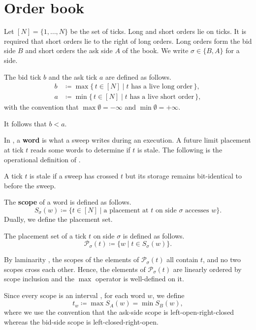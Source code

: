 \section{Order book} \label{sec:book}
Let $[N]=\{1,\dots,N\}$ be the set of ticks. Long and short orders lie on ticks. It is required that short orders lie to the right of long orders. Long orders form the bid side $B$ and short orders the ask side $A$ of the book. We write $\sigma\in\{B,A\}$ for a side.
\begin{definition} \label{def:bidask}
    The bid tick $b$ and the ask tick $a$ are defined as follows.
    \begin{align*}
        b&\coloneqq\max\{\,t\in[N]\mid t \text{ has a live long order}\,\},\\
        a&\coloneqq\min\{\,t\in[N]\mid t \text{ has a live short order}\,\},
    \end{align*}
    with the convention that $\max\emptyset=-\infty$ and $\min\emptyset=+\infty$.
\end{definition}
It follows that $b<a$.

In \textcite{axiomatch2026planetree}, a \textbf{word} is what a sweep writes during an execution. A future limit placement at tick $t$ reads some words to determine if $t$ is stale. The following is the operational definition of \textcite[Definition~1]{axiomatch2026planetree}.
\begin{definition} \label{def:operational}
    A tick $t$ is stale if a sweep has crossed $t$ but its storage remains bit-identical to before the sweep.
\end{definition}
The \textbf{scope} of a word is defined as follows.
\begin{equation*}
        S_\sigma(w)\coloneqq\{t\in[N]\mid \text{a placement at } t \text{ on side } \sigma \text{ accesses } w\}.
\end{equation*}
Dually, we define the placement set.
\begin{definition} \label{def:pset}
    The placement set of a tick $t$ on side $\sigma$ is defined as follows.
    \begin{equation*}
        \mathcal{P}_\sigma(t)\coloneqq\{w\mid t\in S_\sigma(w)\}.
    \end{equation*}
\end{definition}
By laminarity \parencite[Theorem~1]{axiomatch2026planetree}, the scopes of the elements of $\mathcal{P}_\sigma(t)$ all contain $t$, and no two scopes cross each other. Hence, the elements of $\mathcal{P}_\sigma(t)$ are linearly ordered by scope inclusion and the $\max$ operator is well-defined on it.

Since every scope is an interval \parencite[Proposition~1]{axiomatch2026planetree}, for each word $w$, we define
\begin{equation*}
    t_w\coloneqq\max S_A(w)=\min S_B(w),
\end{equation*}
where we use the convention that the ask-side scope is left-open-right-closed whereas the bid-side scope is left-closed-right-open.